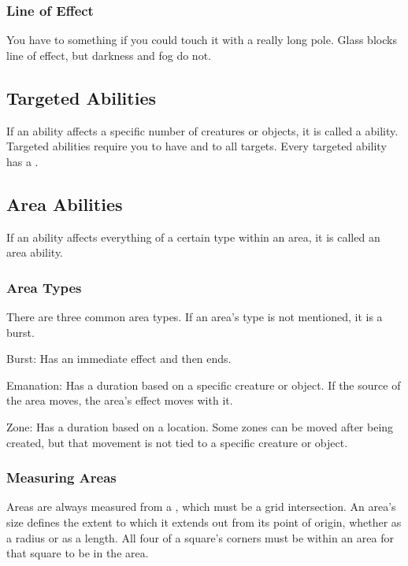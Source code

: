   \subsubsection{Line of Effect}
    You have  to something if you could touch it with a really long pole.
    Glass blocks line of effect, but darkness and fog do not.

  \subsection{Targeted Abilities}\label{Targeted Abilities}
    If an ability affects a specific number of creatures or objects, it is called a  ability.
    Targeted abilities require you to have  and  to all targets.
    Every targeted ability has a .

  \subsection{Area Abilities}\label{Area Abilities}
    If an ability affects everything of a certain type within an area, it is called an area ability.

    \subsubsection{Area Types}\label{Area Types}
      There are three common area types.
      If an area's type is not mentioned, it is a burst.
      \begin{raggeditemize}
        \item Burst: Has an immediate effect and then ends.
        \item Emanation: Has a duration based on a specific creature or object. If the source of the area moves, the area's effect moves with it.
        \item Zone: Has a duration based on a location. Some zones can be moved after being created, but that movement is not tied to a specific creature or object.
      \end{raggeditemize}

    \subsubsection{Measuring Areas}
      Areas are always measured from a , which must be a grid intersection.
      An area's size defines the extent to which it extends out from its point of origin, whether as a radius or as a length.
      All four of a square's corners must be within an area for that square to be in the area.

